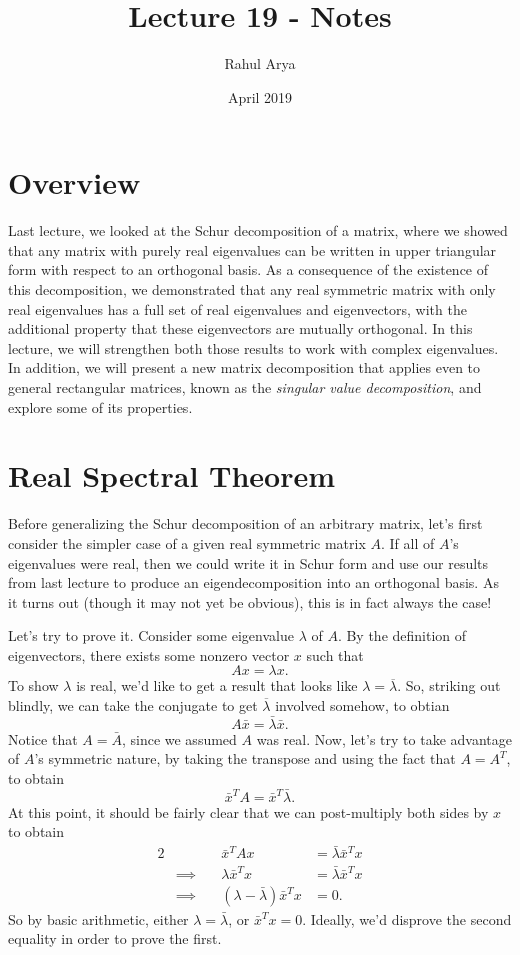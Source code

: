 \documentclass[letterpaper]{article}
\title{Lecture 19 - Notes}
\author{Rahul Arya}
\date{April 2019}
\theoremstyle{remark}
\newcommand{\eqn}[1]{\begin{alignat*}{2}#1\end{alignat*}}
\newcommand*{\thus}{&\implies\quad&}
\begin{document}
\maketitle

\section{Overview}
Last lecture, we looked at the Schur decomposition of a matrix, where we showed that any matrix with purely real eigenvalues can be written in upper triangular form with respect to an orthogonal basis. As a consequence of the existence of this decomposition, we demonstrated that any real symmetric matrix with only real eigenvalues has a full set of real eigenvalues and eigenvectors, with the additional property that these eigenvectors are mutually orthogonal. In this lecture, we will strengthen both those results to work with complex eigenvalues. In addition, we will present a new matrix decomposition that applies even to general rectangular matrices, known as the \emph{singular value decomposition}, and explore some of its properties.

\section{Real Spectral Theorem}
Before generalizing the Schur decomposition of an arbitrary matrix, let's first consider the simpler case of a given real symmetric matrix $A$. If all of $A$'s eigenvalues were real, then we could write it in Schur form and use our results from last lecture to produce an eigendecomposition into an orthogonal basis. As it turns out (though it may not yet be obvious), this is in fact always the case!

Let's try to prove it. Consider some eigenvalue $\lambda$ of $A$. By the definition of eigenvectors, there exists some nonzero vector $x$ such that
\[
    Ax = \lambda x.
\]
To show $\lambda$ is real, we'd like to get a result that looks like $\lambda = \overline{\lambda}$. So, striking out blindly, we can take the conjugate to get $\overline{\lambda}$ involved somehow, to obtian
\[
    A\bar{x} = \bar{\lambda} \bar{x}.
\]
Notice that $A = \bar{A}$, since we assumed $A$ was real. Now, let's try to take advantage of $A$'s symmetric nature, by taking the transpose and using the fact that $A = A^T$, to obtain
\[
    \bar{x}^TA = \bar{x}^T\bar{\lambda}.
\]
At this point, it should be fairly clear that we can post-multiply both sides by $x$ to obtain
\eqn{
    && \bar{x}^TAx &= \bar{\lambda}\bar{x}^Tx \\
    \thus \lambda \bar{x}^Tx &= \bar{\lambda}\bar{x}^T x \\
    \thus (\lambda - \bar{\lambda})\bar{x}^Tx &= 0.
}
So by basic arithmetic, either $\lambda = \bar{\lambda}$, or $\bar{x}^Tx = 0$. Ideally, we'd disprove the second equality in order to prove the first.
\end{document}
